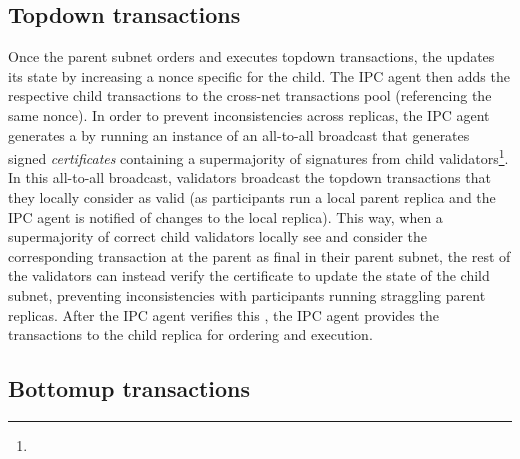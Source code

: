 \subsection{Topdown transactions}
Once the parent subnet orders and executes topdown transactions, the \gw updates its state by increasing a nonce specific for the child. The IPC agent then adds the respective child transactions to the cross-net transactions pool (referencing the same nonce). In order to prevent inconsistencies across replicas, the IPC agent generates a \pof by running an instance of an all-to-all broadcast that generates signed \emph{certificates} containing a supermajority of signatures from child validators\footnote{}. In this all-to-all broadcast, validators broadcast the topdown transactions that they locally consider as valid (as participants run a local parent replica and the IPC agent is notified of changes to the local replica). This way, when a supermajority of correct child validators locally see and consider the corresponding transaction at the parent as final in their parent subnet, the rest of the validators can instead verify the certificate to update the state of the child subnet, preventing inconsistencies with participants running straggling parent replicas. After the IPC agent verifies this \prf, the IPC agent provides the transactions to the child replica for ordering and execution.


\subsection{Bottomup transactions}  
